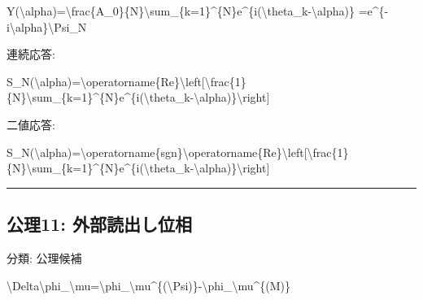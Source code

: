 \documentclass[
  a4paper,
]{ltjsarticle}
\newenvironment{Shaded}{}{}
\newcommand{\NormalTok}[1]{#1}
\begin{document}
\begin{Shaded}
\begin{Highlighting}[]
\NormalTok{Y(\textbackslash{}alpha)=\textbackslash{}frac\{A\_0\}\{N\}\textbackslash{}sum\_\{k=1\}\^{}\{N\}e\^{}\{i(\textbackslash{}theta\_k{-}\textbackslash{}alpha)\}}
\NormalTok{=e\^{}\{{-}i\textbackslash{}alpha\}\textbackslash{}Psi\_N}
\end{Highlighting}
\end{Shaded}

連続応答:

\begin{Shaded}
\begin{Highlighting}[]
\NormalTok{S\_N(\textbackslash{}alpha)=\textbackslash{}operatorname\{Re\}\textbackslash{}left[\textbackslash{}frac\{1\}\{N\}\textbackslash{}sum\_\{k=1\}\^{}\{N\}e\^{}\{i(\textbackslash{}theta\_k{-}\textbackslash{}alpha)\}\textbackslash{}right]}
\end{Highlighting}
\end{Shaded}

二値応答:

\begin{Shaded}
\begin{Highlighting}[]
\NormalTok{S\_N(\textbackslash{}alpha)=\textbackslash{}operatorname\{sgn\}\textbackslash{}operatorname\{Re\}\textbackslash{}left[\textbackslash{}frac\{1\}\{N\}\textbackslash{}sum\_\{k=1\}\^{}\{N\}e\^{}\{i(\textbackslash{}theta\_k{-}\textbackslash{}alpha)\}\textbackslash{}right]}
\end{Highlighting}
\end{Shaded}

\begin{center}\rule{0.5\linewidth}{0.5pt}\end{center}

\subsection{公理11:
外部読出し位相}\label{ux516cux740611-ux5916ux90e8ux8aadux51faux3057ux4f4dux76f8}

分類: 公理候補

\begin{Shaded}
\begin{Highlighting}[]
\NormalTok{\textbackslash{}Delta\textbackslash{}phi\_\textbackslash{}mu=\textbackslash{}phi\_\textbackslash{}mu\^{}\{(\textbackslash{}Psi)\}{-}\textbackslash{}phi\_\textbackslash{}mu\^{}\{(M)\}}
\end{Highlighting}
\end{Shaded}
\end{document}
